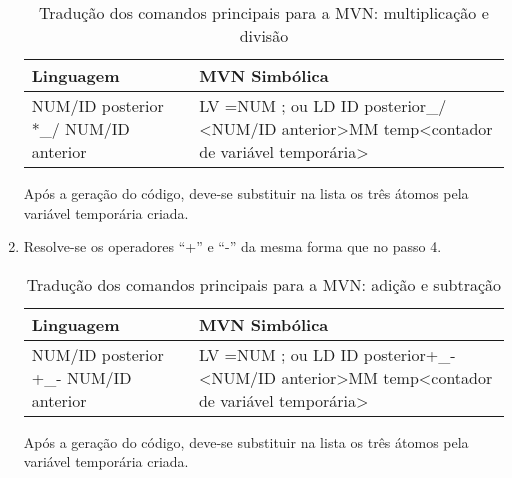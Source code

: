 \begin{enumerate}
		\begin{table}[H]

			\begin{tabular}{| p{7cm} | p{8cm}|}
			\rowcolor{non-photoblue}
			\textbf{Linguagem} & \textbf{MVN Simbólica} \\
			
			\hline

			NUM/ID posterior *\_/ NUM/ID anterior & LV  =NUM ; ou LD ID posterior\newline\newline *\_/  <NUM/ID anterior>\newline\newline MM temp<contador de variável temporária> \\

			\hline
			\end{tabular}
			\caption{Tradução dos comandos principais para a MVN: multiplicação e divisão}
		\end{table}


		Após a geração do código, deve-se substituir na lista os três átomos pela variável temporária criada.

	\item Resolve-se os operadores “+” e “-” da mesma forma que no passo 4.

	\begin{table}[H]

			\begin{tabular}{| p{7cm} | p{8cm}|}
			\rowcolor{non-photoblue}
			\textbf{Linguagem} & \textbf{MVN Simbólica} \\
			
			\hline

			NUM/ID posterior +\_- NUM/ID anterior & LV  =NUM ; ou LD ID posterior\newline\newline +\_-  <NUM/ID anterior>\newline\newline MM temp<contador de variável temporária> \\

			\hline
			\end{tabular}
			\caption{Tradução dos comandos principais para a MVN: adição e subtração}
	\end{table}


	Após a geração do código, deve-se substituir na lista os três átomos pela variável temporária criada.


\end{enumerate}
